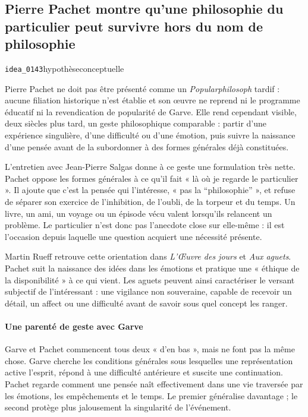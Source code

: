 \documentclass[10pt,a4paper]{article}
\begin{document}
\subsection{Pierre Pachet montre qu'une philosophie du particulier peut survivre hors du nom de philosophie}
{\small\color{metadata} \texttt{idea\_0143}\quad\textbullet\quad hypothèse\quad\textbullet\quad conceptuelle\par}

Pierre Pachet ne doit pas être présenté comme un \emph{Popularphilosoph} tardif : aucune filiation historique n'est établie et son œuvre ne reprend ni le programme éducatif ni la revendication de popularité de Garve. Elle rend cependant visible, deux siècles plus tard, un geste philosophique comparable : partir d'une expérience singulière, d'une difficulté ou d'une émotion, puis suivre la naissance d'une pensée avant de la subordonner à des formes générales déjà constituées.

L'entretien avec Jean-Pierre Salgas donne à ce geste une formulation très nette. Pachet oppose les formes générales à ce qu'il fait « là où je regarde le particulier ». Il ajoute que c'est la pensée qui l'intéresse, « pas la “philosophie” », et refuse de séparer son exercice de l'inhibition, de l'oubli, de la torpeur et du temps. Un livre, un ami, un voyage ou un épisode vécu valent lorsqu'ils relancent un problème. Le particulier n'est donc pas l'anecdote close sur elle-même : il est l'occasion depuis laquelle une question acquiert une nécessité présente.

Martin Rueff retrouve cette orientation dans \emph{L'Œuvre des jours} et \emph{Aux aguets}. Pachet suit la naissance des idées dans les émotions et pratique une « éthique de la disponibilité » à ce qui vient. Les aguets peuvent ainsi caractériser le versant subjectif de l'intéressant : une vigilance non souveraine, capable de recevoir un détail, un affect ou une difficulté avant de savoir sous quel concept les ranger.

\paragraph{Une parenté de geste avec Garve}
Garve et Pachet commencent tous deux « d'en bas », mais ne font pas la même chose. Garve cherche les conditions générales sous lesquelles une représentation active l'esprit, répond à une difficulté antérieure et suscite une continuation. Pachet regarde comment une pensée naît effectivement dans une vie traversée par les émotions, les empêchements et le temps. Le premier généralise davantage ; le second protège plus jalousement la singularité de l'événement.
\end{document}
